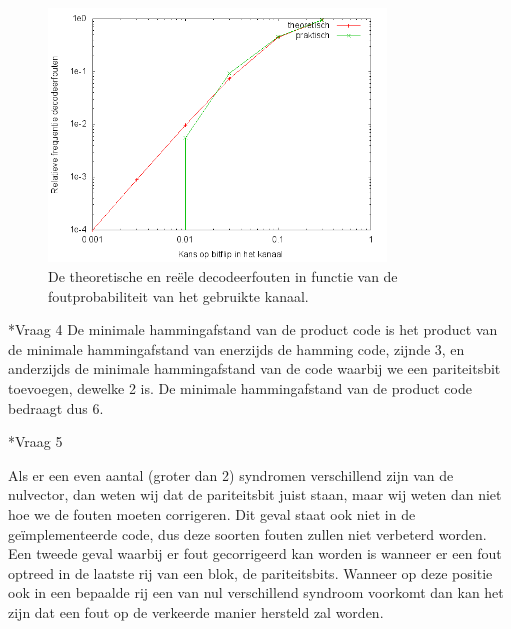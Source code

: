 \documentclass[]{article}
\begin{document}
\begin{section}
\begin{subsection}
        \begin{figure}[h]
            \centering
            \includegraphics[width=0.8\textwidth]{vraag2_3.png}
            \caption{De theoretische en re\"ele decodeerfouten in
                functie van de foutprobabiliteit van het gebruikte
            kanaal.}
            \label{fig:2_3}
        \end{figure}

    \end{subsection}

    \begin{subsection}*{Vraag 4} %
    	De minimale hammingafstand van de product code is het product van de minimale hammingafstand
van enerzijds de hamming code, zijnde 3, en anderzijds de minimale hammingafstand van de code waarbij we een pariteitsbit toevoegen, dewelke 2 is.
De minimale hammingafstand van de product code bedraagt dus 6.
    \end{subsection}

    \begin{subsection}*{Vraag 5} %

        Als er een even aantal (groter dan 2) syndromen verschillend
        zijn van de nulvector, dan weten wij dat de pariteitsbit
        juist staan, maar wij weten dan niet hoe we de fouten moeten
        corrigeren. Dit geval staat ook niet in de ge\"implementeerde
        code, dus deze soorten fouten zullen niet verbeterd worden.
        Een tweede geval waarbij er fout gecorrigeerd kan worden is
        wanneer er een fout optreed in de laatste rij van een blok, de
        pariteitsbits. Wanneer op deze positie ook in een bepaalde rij
        een van nul verschillend syndroom voorkomt dan kan het zijn
        dat een fout op de verkeerde manier hersteld zal worden.


\end{subsection}
\end{section}
\end{document}
